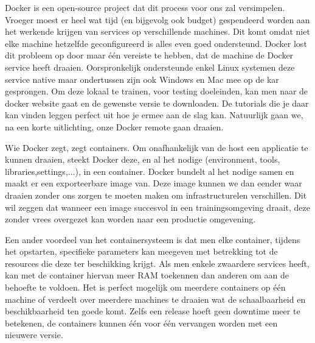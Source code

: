 \documentclass{article}
\begin{document}
	Docker is een open-source project dat dit process voor ons zal versimpelen. Vroeger moest er heel wat tijd (en bijgevolg ook budget) gespendeerd worden aan het werkende krijgen van services op verschillende machines. Dit komt omdat niet elke machine hetzelfde geconfigureerd is alles even goed ondersteund. Docker lost dit probleem op door maar één vereiste te hebben, dat de machine de Docker service heeft draaien. Oorspronkelijk ondersteunde enkel Linux systemen deze service native maar ondertussen zijn ook Windows en Mac mee op de kar gesprongen. Om deze lokaal te trainen, voor testing doeleinden, kan men naar de docker website gaat en de gewenste versie te downloaden. De tutorials die je daar kan vinden leggen perfect uit hoe je ermee aan de slag kan. Natuurlijk gaan we, na een korte uitlichting, onze Docker remote gaan draaien.
	\par
	Wie Docker zegt, zegt containers. Om onafhankelijk van de host een applicatie te kunnen draaien, steekt Docker deze, en al het nodige (environment, tools, libraries,settings,...), in een container. Docker bundelt al het nodige samen en maakt er een exporteerbare image van. Deze image kunnen we dan eender waar draaien zonder ons zorgen te moeten maken om infrastructurelen verschillen. Dit wil zeggen dat wanneer een image succesvol in een trainingsomgeving draait, deze zonder vrees overgezet kan worden naar een productie omgevening.
	\par
	Een ander voordeel van het containersysteem is dat men elke container, tijdens het opstarten, specifieke parameters kan meegeven met betrekking tot de resources die deze ter beschikking krijgt. Als men enkele zwaardere services heeft, kan met de container hiervan meer RAM toekennen dan anderen om aan de behoefte te voldoen. Het is perfect mogelijk om meerdere containers op één machine of verdeelt over meerdere machines te draaien wat de schaalbaarheid en beschikbaarheid ten goede komt. Zelfs een release hoeft geen downtime meer te betekenen, de containers kunnen één voor één vervangen worden met een nieuwere versie.
\end{document}
